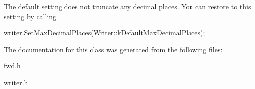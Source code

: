 The default setting does not truncate any decimal places. You can restore to this setting by calling 
\begin{DoxyCode}
writer.SetMaxDecimalPlaces(Writer::kDefaultMaxDecimalPlaces);
\end{DoxyCode}
 

The documentation for this class was generated from the following files\+:\begin{DoxyCompactItemize}
\item 
fwd.\+h\item 
writer.\+h\end{DoxyCompactItemize}
